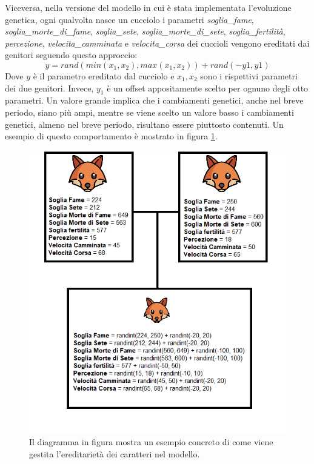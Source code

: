 \documentclass[11pt]{article}
\begin{document}
Viceversa, nella versione del modello in cui è stata implementata l'evoluzione genetica,
ogni qualvolta nasce un cucciolo i parametri \emph{soglia\_fame}, \emph{soglia\_morte\_di\_fame}, \emph{soglia\_sete}, \emph{soglia\_morte\_di\_sete}, \emph{soglia\_fertilità}, \emph{percezione}, \emph{velocita\_camminata} e \emph{velocita\_corsa} dei cuccioli vengono ereditati dai genitori seguendo questo approccio:
\[
    y = rand(min(x_1, x_2), max(x_1, x_2)) + rand(-y1, y1) 
\]
Dove $y$ è il parametro ereditato dal cucciolo e $x_1, x_2$ sono i rispettivi parametri dei due genitori. Invece, $y_1$ è un offset appositamente scelto per ognuno degli otto parametri. Un valore grande implica che i cambiamenti genetici, anche nel breve periodo, siano più ampi, mentre se viene scelto un valore basso i cambiamenti genetici, almeno nel breve periodo,  risultano essere piuttosto contenuti. 
Un esempio di questo comportamento è mostrato in figura \ref{fig:EsempioEvoluzione}. 
\begin{figure}[h!]
     \centering
     \includegraphics[scale = 0.8]{Accoppiamento_evoluzione.png}
     \caption{Il diagramma in figura mostra un esempio concreto di come viene gestita l'ereditarietà dei caratteri nel modello.}
     \label{fig:EsempioEvoluzione}
\end{figure}
\end{document}

